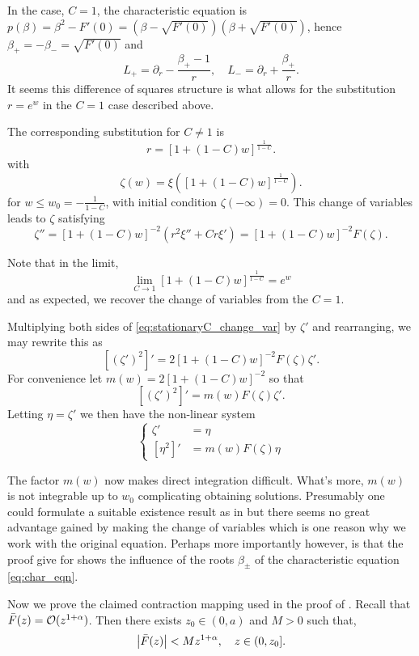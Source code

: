 \documentclass{amsart}
\begin{document}
\begin{rem}
In the case, \(C = 1\), the characteristic equation is \(p(\beta) = \beta^2 - F'(0) = (\beta - \sqrt{F'(0)})(\beta + \sqrt{F'(0)})\), hence \(\beta_+ = -\beta_- = \sqrt{F'(0)}\) and
\[
L_+ = \partial_r - \frac{\beta_+ - 1}{r}, \quad L_- = \partial_r + \frac{\beta_+}{r}.
\]
It seems this difference of squares structure is what allows for the substitution \(r = e^w\) in the \(C=1\) case described above.

The corresponding substitution for \(C \ne 1\) is
\[
r = [1 + (1-C)w]^{\tfrac{1}{1-C}}.
\]
with
\[
\zeta(w) = \xi\left([1 + (1-C)w]^{\tfrac{1}{1-C}}\right).
\]
for \(w \leq w_0 = - \frac{1}{1-C}\), with initial condition \(\zeta(-\infty) = 0\). This change of variables leads to \(\zeta\) satisfying
\begin{equation}
\label{eq:stationaryC_change_var}
\zeta'' = [1 + (1-C)w]^{-2} \left(r^2 \xi'' + C r \xi'\right) = [1 + (1-C)w]^{-2} F(\zeta).
\end{equation}

Note that in the limit,
\[
\lim_{C\to 1} [1 + (1-C)w]^{\tfrac{1}{1-C}} = e^w
\]
and as expected, we recover the change of variables from the \(C = 1\).

Multiplying both sides of \eqref{eq:stationaryC_change_var} by \(\zeta'\) and rearranging, we may rewrite this as
\[
[(\zeta')^2]' = 2 [1 + (1-C)w]^{-2} F(\zeta) \zeta'.
\]
For convenience let \(m(w) = 2[1 + (1-C)w]^{-2}\) so that
\[
[(\zeta')^2]' = m(w) F(\zeta) \zeta'.
\]
Letting \(\eta = \zeta'\) we then have the non-linear system
\[
\begin{cases}
\zeta' &= \eta \\
[\eta^2]' &= m(w) F(\zeta) \eta
\end{cases}
\]

The factor \(m(w)\) now makes direct integration difficult. What's more, \(m(w)\) is not integrable up to \(w_0\) complicating obtaining solutions. Presumably one could formulate a suitable existence result as in  but there seems no great advantage gained by making the change of variables which is one reason why we work with the original equation. Perhaps more importantly however, is that the proof give for  shows the influence of the roots \(\beta_{\pm}\) of the characteristic equation \eqref{eq:char_eqn}.
\end{rem}

Now we prove the claimed contraction mapping used in the proof of . Recall that \(\bar{F}(z) = \operatorname{\mathcal{O}}(z^{1+\alpha})\). Then there exists \(z_0 \in (0, a)\) and \(M > 0\) such that,
\begin{equation}
\label{eq:barF_bound}
\left|{\bar{F}(z)}\right| < M z^{1+\alpha}, \quad z \in (0, z_0].
\end{equation}
\end{document}

